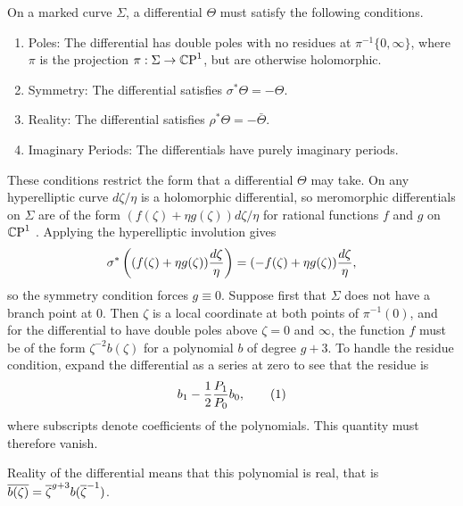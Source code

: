 \documentclass{article}
\begin{document}
On a marked curve $\Sigma$, a differential $\Theta$ must satisfy the following conditions.
\begin{enumerate}[resume*]
\item\label{P:poles} Poles: The differential has double poles with no residues at $\pi^{-1}\{0,\infty\}$, where $\pi$ is the projection $\pi: \Sigma \to \mathbb{C}\text{P}^1$, but are otherwise holomorphic.
\item\label{P:symmetry} Symmetry: The differential satisfies $\sigma^* \Theta = - \Theta$.
\item\label{P:reality} Reality: The differential satisfies $\rho^* \Theta = - \bar{\Theta}$.
\item\label{P:imaginary periods} Imaginary Periods: The differentials have purely imaginary periods.
\end{enumerate}
These conditions restrict the form that a differential $\Theta$ may take. On any hyperelliptic curve $d\zeta/\eta$ is a holomorphic differential, so meromorphic differentials on $\Sigma$ are of the form $(f(\zeta) + \eta g(\zeta))d\zeta/\eta$ for rational functions $f$ and $g$ on $\mathbb{C}\text{P}^1$ \cite[Prop~III.1.10]{Miranda1995}. Applying the hyperelliptic involution gives
\[
\sigma^*\left( (f(\zeta) + \eta g(\zeta))\frac{d\zeta}{\eta} \right) = (-f(\zeta) + \eta g(\zeta))\frac{d\zeta}{\eta},
\]
so the symmetry condition forces $g\equiv 0$. Suppose first that $\Sigma$ does not have a branch point at $0$. Then $\zeta$ is a local coordinate at both points of $\pi^{-1}(0)$, and for  the differential to have double poles above $\zeta=0$ and $\infty$, the function $f$ must be of the form $\zeta^{-2}b(\zeta)$ for a polynomial $b$ of degree $g+3$. To handle the residue condition, expand the differential as a series at zero to see that the residue is
\[
b_1 - \frac{1}{2}\frac{P_1}{P_0}b_0,
\labelthis{eqn:residue}
\]
where subscripts denote coefficients of the polynomials. This quantity must therefore vanish.

Reality of the differential means that this polynomial is real, that is $\overline{b(\zeta)}=\overline{\zeta}^{g+3}b(\overline{\zeta}^{-1})$.
\end{document}
